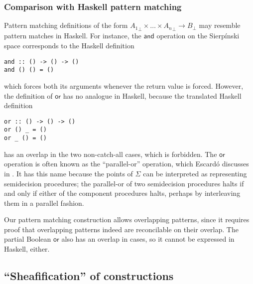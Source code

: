 \documentclass[conference]{IEEEtran}
\begin{document}
\subsubsection{Comparison with Haskell pattern matching}

Pattern matching definitions of the form ${A_1}_\bot \times \ldots \times {A_n}_\bot \to B_\bot$ may resemble pattern matches in Haskell. For instance, the $\mathsf{and}$ operation on the Sierp\'inski space corresponds to the Haskell definition
\begin{verbatim}
and :: () -> () -> ()
and () () = ()
\end{verbatim}
which forces both its arguments whenever the return value is forced. However, the definition of $\mathsf{or}$ has no analogue in Haskell, because the translated Haskell definition
\begin{verbatim}
or :: () -> () -> ()
or () _ = ()
or _ () = ()
\end{verbatim}
has an overlap in the two non-catch-all cases, which is forbidden.
The $\mathsf{or}$ operation is often known as the ``parallel-or'' operation, which Escard\'o discusses in \cite{escardo2004}. It has this name because the points of $\Sigma$ can be interpreted as representing semidecision procedures; the parallel-or of two semidecision procedures halts if and only if either of the component procedures halts, perhaps by interleaving them in a parallel fashion.

Our pattern matching construction allows overlapping patterns, since it requires proof that overlapping patterns indeed are reconcilable on their overlap. The partial Boolean $\mathsf{or}$ also has an overlap  in cases, so it cannot be expressed in Haskell, either.

\subsection{``Sheafification'' of constructions}
\label{s:ex:sheaf}
\end{document}
